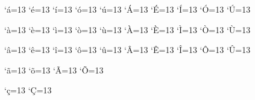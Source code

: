 
\catcode`á=13 
\catcode`é=13 
\catcode`í=13 
\catcode`ó=13 
\catcode`ú=13 
\catcode`Á=13 
\catcode`É=13 
\catcode`Í=13 
\catcode`Ó=13 
\catcode`Ú=13 

\catcode`à=13 
\catcode`è=13 
\catcode`ì=13 
\catcode`ò=13 
\catcode`ù=13 
\catcode`À=13 
\catcode`È=13 
\catcode`Ì=13 
\catcode`Ò=13 
\catcode`Ù=13 

\catcode`â=13 
\catcode`ê=13 
\catcode`î=13 
\catcode`ô=13 
\catcode`û=13 
\catcode`Â=13 
\catcode`Ê=13 
\catcode`Î=13 
\catcode`Ô=13 
\catcode`Û=13 

\catcode`ã=13 
\catcode`õ=13 
\catcode`Ã=13 
\catcode`Õ=13 

\catcode`ç=13 
\catcode`Ç=13 

